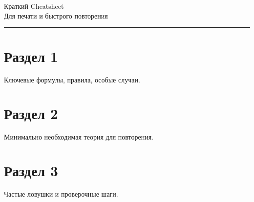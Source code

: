 \documentclass[10pt,landscape,a4paper]{article}
\begin{document}
\begin{center}
  {\Huge Краткий Cheatsheet}\\[0.2cm]
  {\small Для печати и быстрого повторения}\\[0.2cm]
  \rule{\textwidth}{0.6pt}
\end{center}

\begin{multicols}{2}

\section{Раздел 1}
Ключевые формулы, правила, особые случаи.

\section{Раздел 2}
Минимально необходимая теория для повторения.

\section{Раздел 3}
Частые ловушки и проверочные шаги.

\end{multicols}
\end{document}
